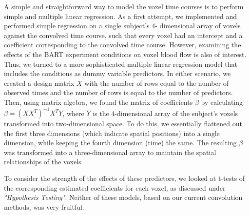 
\par \indent A simple and straightforward way to model the voxel time courses 
is to perform simple and multiple linear regression. As a first attempt, we 
implemented and performed simple regression on a single subject's 4-
dimensional array of voxels against the convolved time course, such that 
every voxel had an intercept and a coefficient corresponding to the convolved 
time course. However, examining the effects of the BART experiment conditions 
on voxel blood flow is also of interest. Thus, we turned to a more 
sophisticated multiple linear regression model that includes the conditions 
as dummy variable predictors. In either scenario, we created a design matrix 
$X$ with the number of rows equal to the number of observed times and the 
number of rows is equal to the number of predictors. Then, using matrix 
algebra, we found the matrix of coefficients $\beta$ by calculating $\beta = 
(X X^T)^{-1} X^T Y$, where $Y$ is the 4-dimensional array of the subject's 
voxels transformed into two-dimensional space. To do this, we essentially 
flattened out the first three dimensions (which indicate spatial positions) 
into a single dimension, while keeping the fourth dimension (time) the same. 
The resulting $\beta$ was transformed into a three-dimensional array to 
maintain the spatial relationships of the voxels. 

\par To consider the strength of the effects of these predictors, we looked 
at t-tests of the corresponding estimated coefficients for each voxel, as 
discussed under \textit{"Hypothesis Testing"}. Neither of these models, based 
on our current convolution methods, was very fruitful. 

